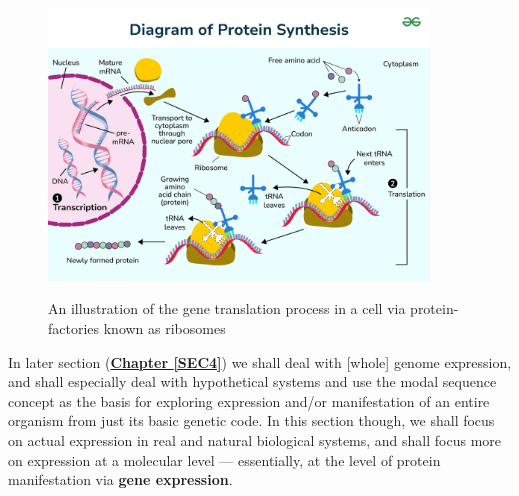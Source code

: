 \documentclass[a4paper, 18pt]{book} %
\begin{document}
\begin{figure}[H]
	\begin{center}
		\includegraphics[width=0.9\textwidth]{resources/images/protein_synthesis.png} \\
		\caption{An illustration of the gene translation process in a cell via protein-factories known as ribosomes\cite{geeksforgeeks2024protein}}
		\label{FIG2}
\end{center}
\end{figure}
    
    
In later section (\textbf{\hyperref[SEC4]{Chapter \ref{SEC4}}}) we shall deal with [whole] genome expression, and shall especially deal with hypothetical systems and use the modal sequence concept as the basis for exploring expression and/or manifestation of an entire organism from just its basic genetic code. In this section though, we shall focus on actual expression in real and natural biological systems, and shall focus more on expression at a molecular level --- essentially, at the level of protein manifestation via \textbf{gene expression}.\\
\end{document}

